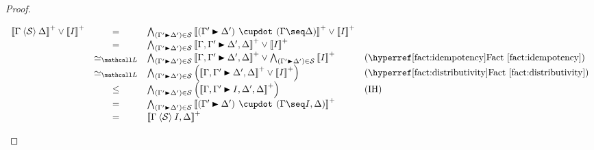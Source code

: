 \begin{proof}
\begin{itemize}
$$\begin{array}{rcll}
      \psint{\Gamma \piq{\cS} \Delta} \lor \psint{I}
      &=& \psintAndMix{(\Gamma' \JB \Delta')}{\cS}{\Gamma}{\Delta} \lor \psint{I} & \\
      &=& \psintAnd{(\Gamma' \JB \Delta')}{\cS}{\Gamma, \Gamma' \JB \Delta', \Delta} \lor \psint{I} & \\
      &\semequiv_{\Lattice}& \psintAnd{(\Gamma' \JB \Delta')}{\cS}{\Gamma, \Gamma' \JB \Delta', \Delta} \lor \psintAnd{(\Gamma' \JB \Delta')}{\cS}{I} &\text{(\reffact{idempotency})} \\
      &\semequiv_{\Lattice}& \bigwedge_{(\Gamma' \JB \Delta') \in \cS}{\left(\psint{\Gamma, \Gamma' \JB \Delta', \Delta} \lor \psint{I}\right)} &\text{(\reffact{distributivity})} \\
      &\sement& \bigwedge_{(\Gamma' \JB \Delta') \in \cS}{\left(\psint{\Gamma, \Gamma' \JB I, \Delta', \Delta} \right)} &\text{(IH)} \\
      &=& \psintAndMix{(\Gamma' \JB \Delta')}{\cS}{\Gamma}{I, \Delta} & \\
      &=& \psint{\Gamma \piq{\cS} I, \Delta} & \\
    \end{array}
    $$
  \end{itemize}
\end{proof}

